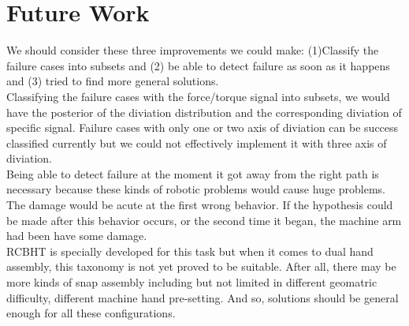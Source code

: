 \section{Future Work}
We should consider these three improvements we could make: (1)Classify the failure cases into subsets and (2) be able to detect failure as soon as it happens and (3) tried to find more general solutions.\\ 
\indent Classifying the failure cases with the force/torque signal into subsets, we would have the posterior of the diviation distribution and the corresponding diviation of specific signal. Failure cases with only one or two axis of diviation can be success classified currently but we could not effectively implement it with three axis of diviation. \\
\indent Being able to detect failure at the moment it got away from the right path is necessary because these kinds of robotic problems would cause huge problems. The damage would be acute at the first wrong behavior. If the hypothesis could be made after this behavior occurs, or the second time it began, the machine arm had been have some damage.\\ 
\indent RCBHT is specially developed for this task but when it comes to dual hand assembly, this taxonomy is not yet proved to be suitable. After all, there may be more kinds of snap assembly including but not limited in different geomatric difficulty, different machine hand pre-setting. And so, solutions should be general enough for all these configurations.
